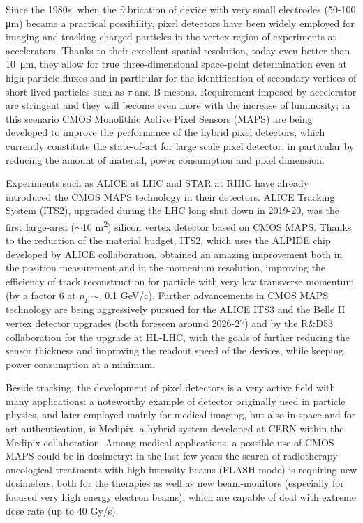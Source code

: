 Since the 1980s, when the fabrication of device with very small electrodes (50-100 \si{\um}) became a practical possibility, pixel detectors have been widely employed for imaging and tracking charged particles in the vertex region of experiments at accelerators. Thanks to their excellent spatial resolution, today even better than \SI{10}{\um}, they allow for true three-dimensional space-point determination even at high particle fluxes and in particular for the identification of secondary vertices of short-lived particles such as $\tau$ and B mesons.
Requirement imposed by accelerator are stringent and they will become even more with the increase of luminosity; in this scenario CMOS Monolithic Active Pixel Sensors (MAPS) are being developed to improve the performance of the hybrid pixel detectors, which currently constitute the state-of-art for large scale pixel detector, in particular by reducing the amount of material, power consumption and pixel dimension.

Experiments such as ALICE at LHC and STAR at RHIC have already introduced the CMOS MAPS technology in their detectors. ALICE Tracking System (ITS2), upgraded during the LHC long shut down in 2019-20, was the first large-area ($\sim$10 \si{m^2}) silicon vertex detector based on CMOS MAPS. Thanks to the reduction of the material budget, ITS2, which uses the ALPIDE chip developed by ALICE collaboration, obtained an amazing improvement both in the position measurement and in the momentum resolution, improving the efficiency of track reconstruction for particle with very low transverse momentum (by a factor 6 at $p_{T}\sim$ 0.1 \si{GeV/c}).
Further advancements in CMOS MAPS technology are being aggressively pursued for the ALICE ITS3 and the Belle II vertex detector upgrades (both foreseen around 2026-27) and by the R$\&$D53 collaboration for the upgrade at HL-LHC, with the goals of further reducing the sensor thickness and improving the readout speed of the devices, while keeping power consumption at a minimum.

Beside tracking, the development of pixel detectors is a very active field with many applications: a noteworthy example of detector originally used in particle physics, and later employed mainly for medical imaging, but also in space and for art authentication, is Medipix, a hybrid system developed at CERN within the Medipix collaboration.
Among medical applications, a possible use of CMOS MAPS could be in dosimetry: in the last few years the search of radiotherapy oncological treatments with high intensity beams (FLASH mode) is requiring new dosimeters, both for the therapies as well as new beam-monitors (especially for focused very high energy electron beams), which are capable of deal with extreme dose rate (up to 40 \si{Gy/s}).


